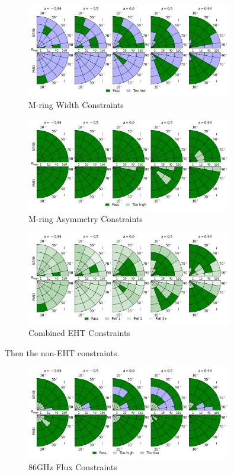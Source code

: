 \begin{figure}
  \centering
  \includegraphics[width=0.8\textwidth]{./figures/Mring_w_Constraints.png}
  \caption{M-ring Width Constraints}
  \label{fig:mring_width_pizza}
\end{figure}
\begin{figure}
  \centering
  \includegraphics[width=0.8\textwidth]{./figures/Mring_f1_Constraints.png}
  \caption{M-ring Asymmetry Constraints}
  \label{fig:mring_asymm_pizza}
\end{figure}
\begin{figure}
  \centering
  \includegraphics[width=0.8\textwidth]{./figures/Interferometric_Constraints.png}
  \caption{Combined EHT Constraints}
  \label{fig:eht_comb_pizza}
\end{figure}

Then the non-EHT constraints.

\begin{figure}
  \centering
  \includegraphics[width=0.8\textwidth]{./figures/86GHz_flux_Constraints.png}
  \caption{86GHz Flux Constraints}
  \label{fig:86GHz_flux_pizza}
\end{figure}

